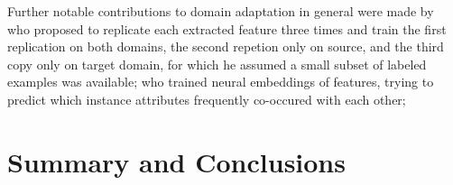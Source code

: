 Further notable contributions to domain adaptation in general were
made by~\citet{Daume:07} who proposed to replicate each extracted
feature three times and train the first replication on both domains,
the second repetion only on source, and the third copy only on target
domain, for which he assumed a small subset of labeled examples was
available; \citet{Yang:15} who trained neural embeddings of features,
trying to predict which instance attributes frequently co-occured with
each other;

\section{Summary and Conclusions}\label{slsa:subsec:conclusions}
